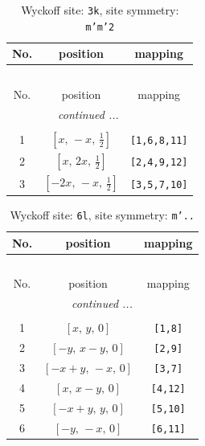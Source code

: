 \documentclass[fleqn,8pt]{jsarticle}
\begin{document}
\begin{longtable}{ccc}
\caption{Wyckoff site: {\tt 3k}, site symmetry: {\tt m'm'2}}
 \\
 \hline \hline
No. & position & mapping \\ \hline \endfirsthead

\multicolumn{2}{l}{\tablename\ \thetable{}} \\
 \hline \hline
No. & position & mapping \\ \hline \endhead

 \hline \hline
\multicolumn{2}{r}{\footnotesize\it continued ...} \\ \endfoot

 \hline \hline
\multicolumn{2}{r}{} \\ \endlastfoot

1 & $\left[ x,\, - x,\, \frac{1}{2} \right]$ & {\tt [1,6,8,11]} \\ \hline
2 & $\left[ x,\, 2 x,\, \frac{1}{2} \right]$ & {\tt [2,4,9,12]} \\ \hline
3 & $\left[ - 2 x,\, - x,\, \frac{1}{2} \right]$ & {\tt [3,5,7,10]} \\
\end{longtable}
\renewcommand{\arraystretch}{1.2}
\begin{longtable}{ccc}
\caption{Wyckoff site: {\tt 6l}, site symmetry: {\tt m'..}}
 \\
 \hline \hline
No. & position & mapping \\ \hline \endfirsthead

\multicolumn{2}{l}{\tablename\ \thetable{}} \\
 \hline \hline
No. & position & mapping \\ \hline \endhead

 \hline \hline
\multicolumn{2}{r}{\footnotesize\it continued ...} \\ \endfoot

 \hline \hline
\multicolumn{2}{r}{} \\ \endlastfoot

1 & $\left[ x,\, y,\, 0 \right]$ & {\tt [1,8]} \\ \hline
2 & $\left[ - y,\, x - y,\, 0 \right]$ & {\tt [2,9]} \\ \hline
3 & $\left[ - x + y,\, - x,\, 0 \right]$ & {\tt [3,7]} \\ \hline
4 & $\left[ x,\, x - y,\, 0 \right]$ & {\tt [4,12]} \\ \hline
5 & $\left[ - x + y,\, y,\, 0 \right]$ & {\tt [5,10]} \\ \hline
6 & $\left[ - y,\, - x,\, 0 \right]$ & {\tt [6,11]} \\
\end{longtable}
\end{document}
